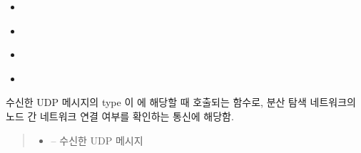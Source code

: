 \documentclass[a4paper,10pt,english]{sphinxmanual}
\begin{document}
\begin{fulllineitems}
\begin{fulllineitems}
\begin{quote}
\begin{description}
\begin{itemize}
\end{itemize}

\end{description}\end{quote}


\nopagebreak

\begin{itemize}
\item {} 
\sphinxAtStartPar
{\hyperref[\detokenize{_kademlia:KNode._onPing}]{}}

\item {} 
\sphinxAtStartPar
{\hyperref[\detokenize{_kademlia:KNode._onStore}]{}}

\item {} 
\sphinxAtStartPar
{\hyperref[\detokenize{_kademlia:KNode._onDelete}]{}}

\item {} 
\sphinxAtStartPar
{\hyperref[\detokenize{_kademlia:KNode._onFindValue}]{}}

\end{itemize}



\end{fulllineitems}


\begin{fulllineitems}
\label{\detokenize{_kademlia:KNode._onPing}}
\pysigstartsignatures
{}
\pysigstopsignatures
\sphinxAtStartPar
수신한 UDP 메시지의 type 이  에 해당할 때 호출되는 함수로,
분산 탐색 네트워크의 노드 간 네트워크 연결 여부를 확인하는 통신에 해당함.
\begin{quote}\begin{description}
\begin{itemize}
\item {} 
\sphinxAtStartPar
{} – 수신한 UDP 메시지

\end{itemize}


\end{description}
\end{quote}
\end{fulllineitems}
\end{fulllineitems}
\end{document}
